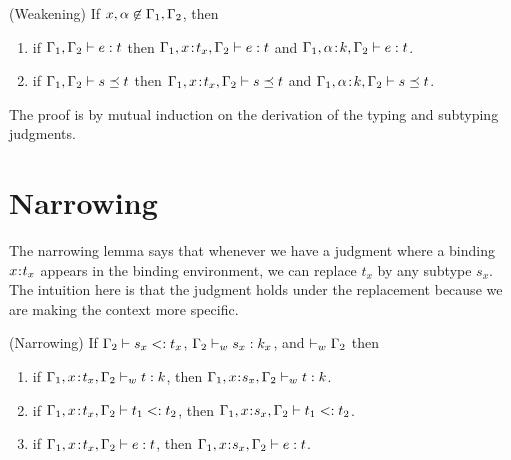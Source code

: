 
\begin{lemma}\label{lem:weakening} (Weakening)
If $\notmem{x,\al}{{\tcenv_1, \tcenv_2}}$, then
    \begin{enumerate}
        \item if ${\mathrm{\Gamma}_1, \mathrm{\Gamma}_2} \vdash {\ensuremath{e}} : {t}$
        then ${\mathrm{\Gamma}_1, {{x}\!:\!{t_x}}, \mathrm{\Gamma}_2} \vdash {\ensuremath{e}} : {t}$ and ${\mathrm{\Gamma}_1, {{\alpha}\!:\!{k}}, \mathrm{\Gamma}_2} \vdash {\ensuremath{e}} : {t}$.
        \item if ${\mathrm{\Gamma}_1, \mathrm{\Gamma}_2} \vdash s \preceq t$
        then ${\mathrm{\Gamma}_1, {{x}\!:\!{t_x}}, \mathrm{\Gamma}_2} \vdash s \preceq t$
        and ${\mathrm{\Gamma}_1, {{\alpha}\!:\!{k}}, \mathrm{\Gamma}_2} \vdash s \preceq t$.
    \end{enumerate}
\end{lemma}

The proof is by mutual induction
on the derivation of the typing and subtyping judgments.

\section{Narrowing} 
\label{sec:soundness:narrowing}

The narrowing lemma says that whenever
we have a judgment where a binding
$x\hspace{0.05em}{:}\hspace{0.05em} t_x$ appears in the binding
environment, we can replace $t_x$
by any subtype $s_x$.
%
The intuition here is that the judgment
holds under the replacement because we
are making the context more specific.

\begin{lemma} \label{subtype-env} \label{lem:narrowing} (Narrowing)
    If $\mathrm{\Gamma}_2 \vdash s_x <: t_x$,  ${\mathrm{\Gamma}_2} \vdash_w {s_x} : {k_x}$,
    and $\vdash_w {\mathrm{\Gamma}_2}$ then
    \begin{enumerate}
        \item if $\mathrm{\Gamma}_1, {{x}\!:\!{t_x}}, \mathrm{\Gamma}_2 \vdash_w t : k$, then
                 $\mathrm{\Gamma}_1, x\hspace{0.05em}{:}\hspace{0.05em} s_x, \mathrm{\Gamma}_2 \vdash_w t : k $.
        \item if $\mathrm{\Gamma}_1, {{x}\!:\!{t_x}}, \mathrm{\Gamma}_2 \vdash t_1 <: t_2$, then
                 $\mathrm{\Gamma}_1, x\hspace{0.05em}{:}\hspace{0.05em} s_x, \mathrm{\Gamma}_2 \vdash t_1 <: t_2$.
        \item if $\mathrm{\Gamma}_1, {{x}\!:\!{t_x}}, \mathrm{\Gamma}_2 \vdash e : t$, then
                 $\mathrm{\Gamma}_1, x\hspace{0.05em}{:}\hspace{0.05em} s_x, \mathrm{\Gamma}_2 \vdash e : t$.
    \end{enumerate}
\end{lemma}

